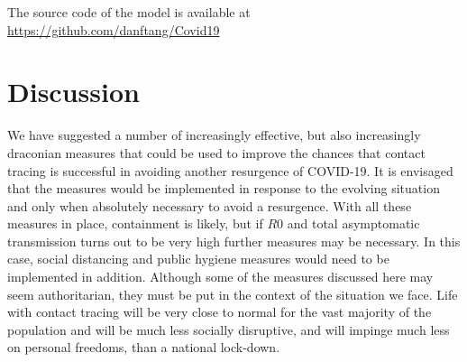 \documentclass{article}
\begin{document}
The source code of the model is available at \href{https://github.com/danftang/Covid19}{https://github.com/danftang/Covid19}


\section{Discussion}

We have suggested a number of increasingly effective, but also increasingly draconian measures that could be used to improve the chances that contact tracing is successful in avoiding another resurgence of COVID-19. It is envisaged that the measures would be implemented in response to the evolving situation and only when absolutely necessary to avoid a resurgence. With all these measures in place, containment is likely, but if $R0$ and total asymptomatic transmission turns out to be very high further measures may be necessary. In this case, social distancing and public hygiene measures would need to be implemented in addition. Although some of the measures discussed here may seem authoritarian, they must be put in the context of the situation we face. Life with contact tracing will be very close to normal for the vast majority of the population and will be much less socially disruptive, and will impinge much less on personal freedoms, than a national lock-down.

%
% 


\end{document}
